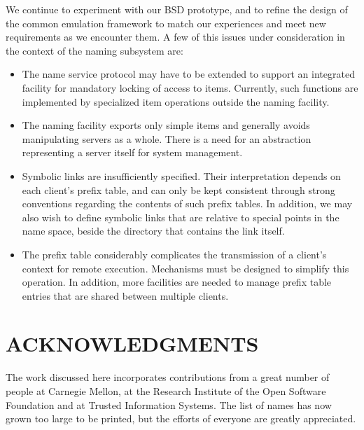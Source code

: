We continue to experiment with our BSD prototype, and to refine the
design of the common emulation framework to match our experiences and
meet new requirements as we encounter them. A few of this issues under
consideration in the context of the naming subsystem are:
\begin{itemize}

\item The name service protocol may have to be extended to support an
integrated facility for mandatory locking of access to items.
Currently, such functions are implemented by specialized item
operations outside the naming facility.

\item The naming facility exports only simple items and generally
avoids manipulating servers as a whole. There is a need for an
abstraction representing a server itself for system management.

\item Symbolic links are insufficiently specified. Their
interpretation depends on each client's prefix table, and can only be
kept consistent through strong conventions regarding the contents of
such prefix tables. In addition, we may also wish to define symbolic
links that are relative to special points in the name space, beside
the directory that contains the link itself.

\item The prefix table considerably complicates the transmission of a
client's context for remote execution. Mechanisms must be designed to
simplify this operation. In addition, more facilities are needed to
manage prefix table entries that are shared between multiple clients.

\end{itemize}

\section*{ACKNOWLEDGMENTS}

The work discussed here incorporates contributions from a great number
of people at Carnegie Mellon, at the Research Institute of the Open
Software Foundation and at Trusted Information Systems. The list of
names has now grown too large to be printed, but the efforts of
everyone are greatly appreciated.

%
%

